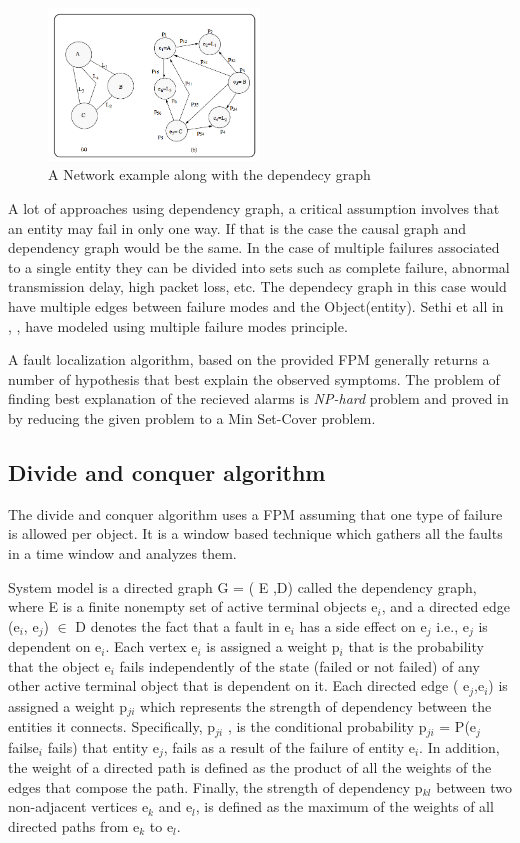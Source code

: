 \documentclass[10pt]{sigplan-proc-varsize}
\begin{document}
\begin{figure}[h!]
  \caption{A Network example along with the dependecy graph \cite{Katzela:95}}
  \centering
    \includegraphics[width=0.5\textwidth]{Fig4}
\end{figure}

A lot of approaches using dependency graph, a critical assumption involves that an entity may fail in only one way. If that is the case the causal graph and dependency graph would be the same.  In the case of multiple failures associated to a single entity they can be divided into sets such as complete failure, abnormal transmission delay, high packet loss, etc. The dependecy graph in this case would have multiple edges between failure modes and the Object(entity). Sethi et all in \cite{Sethi:02}, \cite{Sethi:041}, \cite{Sethi:04} have modeled using multiple failure modes principle. 

A fault localization algorithm, based on the provided FPM generally returns a number of hypothesis that best explain the observed symptoms. The problem of finding best explanation of the recieved alarms is {\it{NP-hard}} problem and proved in \cite{Katzela:95} by reducing the given problem to a Min Set-Cover problem.

\subsection{Divide and conquer algorithm}
The divide and conquer algorithm uses a FPM assuming that one type of failure is allowed per object. It is a window based technique which gathers all the faults in a time window and analyzes them. 

System model is a directed graph G = ( E ,D) called the dependency graph, where E is a finite nonempty set of active terminal objects e$_i$, and a directed edge (e$_i$, e$_j$) $\in$ D denotes the fact that a fault in e$_i$ has a side effect on e$_j$ i.e., e$_j$ is dependent on e$_i$.
Each vertex e$_i$ is assigned a weight p$_i$ that is the probability that the object e$_i$ fails independently of the state (failed or not failed) of any other active terminal object that is dependent on it. Each directed edge ( e$_j$,e$_i$) is assigned a weight p$_{ji}$ which represents the strength of dependency between the entities it connects. Specifically, p$_{ji}$ , is the conditional probability p$_{ji}$ = P(e$_j$ fails\textbar e$_i$ fails) that entity e$_j$, fails as a result of the failure of entity e$_i$. In addition, the weight of a directed path is defined as the product of all the weights of the edges that compose the path. Finally, the strength of dependency p$_{kl}$ between two non-adjacent vertices e$_k$ and e$_l$, is defined as the maximum of the weights of all directed paths from e$_k$ to e$_l$.
\end{document}
